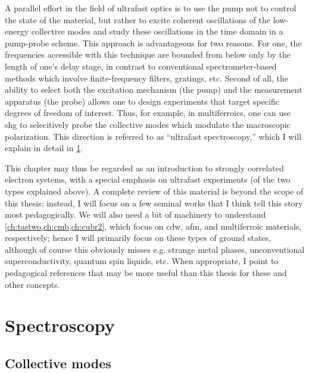 A parallel effort in the field of ultrafast optics is to use the pump not to control the state of the material, but rather to excite coherent oscillations of the low-energy collective modes and study these oscillations in the time domain in a pump-probe scheme.
This approach is advantageous for two reasons.
For one, the frequencies accessible with this technique are bounded from below only by the length of one's delay stage, in contrast to conventional spectrometer-based methods which involve finite-frequency filters, gratings, etc.
Second of all, the ability to select both the excitation mechanism (the pump) and the measurement apparatus (the probe) allows one to design experiments that target specific degrees of freedom of interest.
Thus, for example, in multiferroics, one can use \gls{shg} to selecitively probe the collective modes which modulate the macroscopic polarization.
This direction is referred to as ``ultrafast spectroscopy,'' which I will explain in detail in \cref{sec:ultrafastspectroscopy}.

This chapter may thus be regarded as an introduction to strongly correlated electron systems, with a special emphasis on ultrafast experiments (of the two types explained above).
A complete review of this material is beyond the scope of this thesis; instead, I will focus on a few seminal works that I think tell this story most pedagogically.
We will also need a bit of machinery to understand \cref{ch:tastwo,ch:cmb,ch:cubr2}, which focus on \gls{cdw}, \gls{afm}, and multiferroic materials, respectively; hence I will primarily focus on these types of ground states, although of course this obviously misses e.g. strange metal phases, unconventional superconductivity, quantum spin liquids, etc.
When appropriate, I point to pedagogical references that may be more useful than this thesis for these and other concepts.

\section{Spectroscopy}\label{sec:ultrafastspectroscopy}

\subsection{Collective modes}

